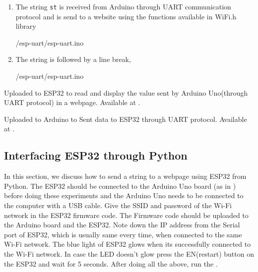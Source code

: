\begin{enumerate}
\item The string {\tt st} is received from Arduino through UART communication protocol and is send to a website using the functions available in WiFi.h library
        
        {\LocTMPardcode/esp-uart/esp-uart.ino} 
        
\item The string is followed by a line break,

        {\LocTMPardcode/esp-uart/esp-uart.ino}
\end{enumerate}

\begin{ardcode}
{Uploaded to ESP32 to read and display the value sent by Arduino
Uno(through UART protocol) in a webpage. Available at
    .}
  \label{esp:uart}
  
\end{ardcode}

\begin{ardcode}
{Uploaded to Arduino to Sent data to ESP32 through UART
protocol. Available at
    .}
  \label{ard:uart}
  
\end{ardcode}

\subsection{Interfacing ESP32 through Python}
In this section, we discuss how to send a string to a webpage
using ESP32 from Python. The ESP32 should be connected to the
Arduino Uno board (as in ) before doing these
experiments and the Arduino Uno needs to be connected to the
computer with a USB cable. Give the SSID and password of the
Wi-Fi network in the ESP32 firmware code. The Firmware code
should be
uploaded to the Arduino board and the ESP32. Note down the IP
address from the Serial port of ESP32, which is usually same
every time, when connected to the same Wi-Fi network. The blue
light
of ESP32 glows when its successfully connected to the Wi-Fi
network. In case the LED doesn’t glow press the EN(restart)
button on the ESP32 and wait for 5 seconds. After doing all the
above,
run the .


